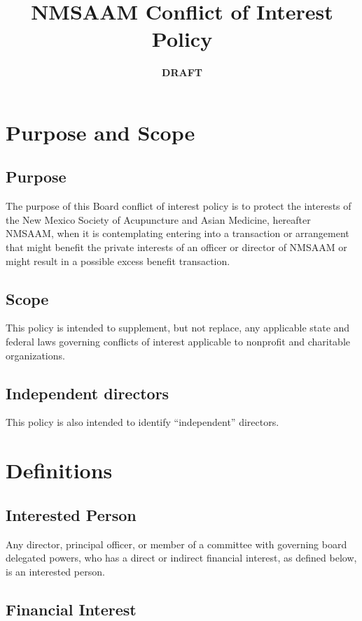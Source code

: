 \documentclass[letterpaper,12pt]{article}
\date{\textbf{\textbf{DRAFT}}}
\title{NMSAAM Conflict of Interest Policy}
\begin{document}
\maketitle

\section{Purpose and Scope}
\label{sec:org4c8f820}

\subsection{Purpose}
\label{sec:org95e9f48}
The purpose of this Board conflict of interest policy is to protect
the interests of the New Mexico Society of Acupuncture and Asian
Medicine, hereafter NMSAAM, when it is contemplating entering into
a transaction or arrangement that might benefit the private
interests of an officer or director of NMSAAM or might result in a
possible excess benefit transaction.

\subsection{Scope}
\label{sec:orgca82d18}
This policy is intended to supplement, but not replace, any
applicable state and federal laws governing conflicts of interest
applicable to nonprofit and charitable organizations.

\subsection{Independent directors}
\label{sec:orge22d88a}
This policy is also intended to identify “independent” directors.


\section{Definitions}
\label{sec:orgef540f5}

\subsection{Interested Person}
\label{sec:orgb9d42af}
Any director, principal officer, or member of
a committee with governing board delegated powers, who has a direct
or indirect financial interest, as defined below, is an interested
person.

\subsection{Financial Interest}
\label{sec:orga612e5b}
\end{document}
